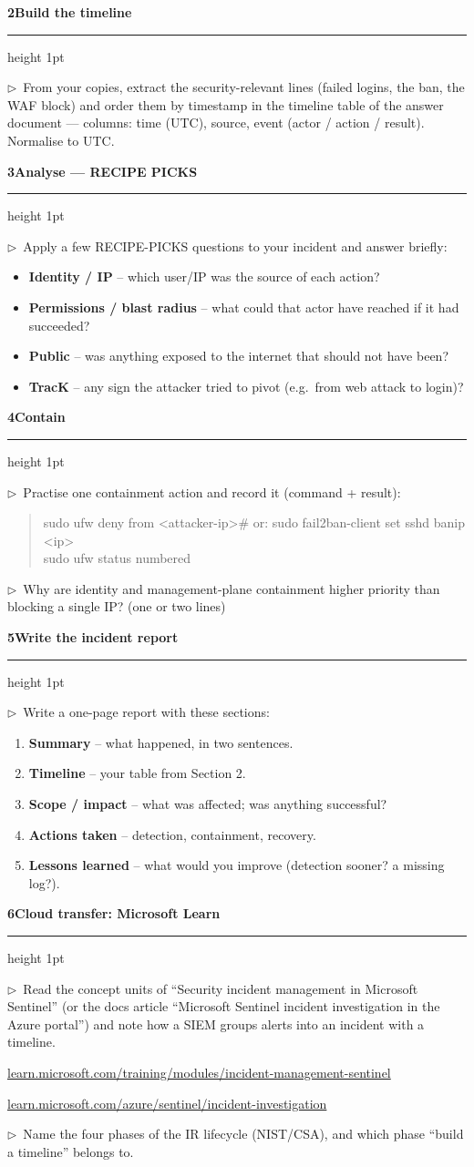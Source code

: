 \documentclass[11pt]{article}
\newcommand{\wbsection}[1]{\par\vspace{11pt}\noindent
  {\large\bfseries\color{kred}#1}\par\vspace{2pt}
  {\color{kred!35}\hrule height 1pt}\par\vspace{6pt}}
\newcommand{\task}[1]{\par\vspace{4pt}\noindent
  \textcolor{kred}{\textbf{$\triangleright$}}~#1\par\vspace{2pt}}
\renewcommand{\emph}[1]{\textup{#1}}
\begin{document}
\wbsection{2\quad Build the timeline}
\task{From your copies, extract the security-relevant lines (failed logins, the ban, the WAF block) and
order them by timestamp in the timeline table of the answer document --- columns: time (UTC), source,
event (actor / action / result). Normalise to UTC.}

\wbsection{3\quad Analyse --- RECIPE PICKS}
\task{Apply a few RECIPE-PICKS questions to your incident and answer briefly:}
\begin{itemize}
\item \textbf{Identity / IP} -- which user/IP was the source of each action?
\item \textbf{Permissions / blast radius} -- what could that actor have reached if it had succeeded?
\item \textbf{Public} -- was anything exposed to the internet that should not have been?
\item \textbf{TracK} -- any sign the attacker tried to pivot (e.g.\ from web attack to login)?
\end{itemize}

\wbsection{4\quad Contain}
\task{Practise \emph{one} containment action and record it (command + result):}
\begin{quote}\ttfamily
sudo ufw deny from <attacker-ip>\hfill\# or: sudo fail2ban-client set sshd banip <ip>\\
sudo ufw status numbered
\end{quote}
\task{Why are \emph{identity} and \emph{management-plane} containment higher priority than blocking a
single IP? (one or two lines)}

\wbsection{5\quad Write the incident report}
\task{Write a one-page report with these sections:}
\begin{enumerate}
\item \textbf{Summary} -- what happened, in two sentences.
\item \textbf{Timeline} -- your table from Section 2.
\item \textbf{Scope / impact} -- what was affected; was anything successful?
\item \textbf{Actions taken} -- detection, containment, recovery.
\item \textbf{Lessons learned} -- what would you improve (detection sooner? a missing log?).
\end{enumerate}

\wbsection{6\quad Cloud transfer: Microsoft Learn}
\task{Read the concept units of ``Security incident management in Microsoft Sentinel'' (or the docs
article ``Microsoft Sentinel incident investigation in the Azure portal'') and note how a SIEM groups
alerts into an \emph{incident} with a timeline.}
\par\noindent\mbox{\href{https://learn.microsoft.com/training/modules/incident-management-sentinel/}{learn.microsoft.com/training/modules/incident-management-sentinel}}
\par\noindent\mbox{\href{https://learn.microsoft.com/azure/sentinel/incident-investigation}{learn.microsoft.com/azure/sentinel/incident-investigation}}
\task{Name the four phases of the IR lifecycle (NIST/CSA), and which phase ``build a timeline'' belongs
to.}
\end{document}
